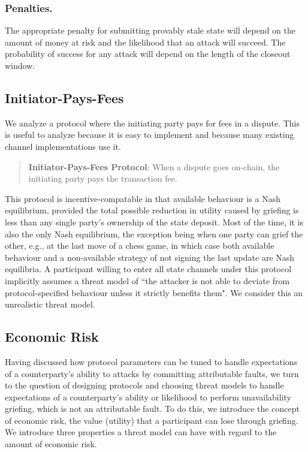 \documentclass[prb,floatfix,reprint,nofootinbib,amsmath,amssymb,epsfig,pre,floats,letterpaper,groupedaffiliation,tightenlines,allcolors=blue,11pt]{revtex4}
\theoremstyle{definition}
\theoremstyle{definition}
\theoremstyle{definition}
\begin{document}
\subsubsection{Penalties.} The appropriate penalty for submitting provably stale state will depend on the amount of money at risk and the likelihood that an attack will succeed. The probability of success for any attack will depend on the length of the closeout window.

\subsection{Initiator-Pays-Fees}

We analyze a protocol where the initiating party pays for fees in a dispute. This is useful to analyze because it is easy to implement and because many existing channel implementations \cite{sprites, perun} use it.

\begin{quote}
\textbf{Initiator-Pays-Fees Protocol}: When a dispute goes on-chain, the initiating party pays the transaction fee.
\end{quote}

This protocol is incentive-compatable in that available behaviour is a Nash equilibrium, provided the total possible reduction in utility caused by griefing is less than any single party's ownership of the state deposit. Most of the time, it is also the only Nash equilibrium, the exception being when one party can grief the other, e.g., at the last move of a chess game, in which case both available behaviour and a non-available strategy of not signing the last update are Nash equilibria. A participant willing to enter all state channels under this protocol implicitly assumes a threat model of ``the attacker is not able to deviate from protocol-specified behaviour unless it strictly benefits them". We consider this an unrealistic threat model.

\subsection{Economic Risk}

Having discussed how protocol parameters can be tuned to handle expectations of a counterparty's ability to attacks by committing attributable faults, we turn to the question of designing protocols and choosing threat models to handle expectations of a counterparty's ability or likelihood to perform unavailability griefing, which is not an attributable fault. To do this, we introduce the concept of economic risk, the value (utility) that a participant can lose through griefing. We introduce three properties a threat model can have with regard to the amount of economic risk.
\end{document}
